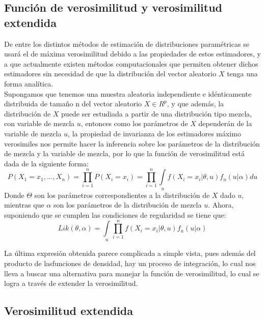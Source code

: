 \documentclass[11pt]{book}
\begin{document}
\subsection*{Función de verosimilitud y verosimilitud extendida}

 De entre los distintos métodos de estimación de distribuciones paramétricas se usará el de máxima verosimilitud debido a las propiedades de estos estimadores, y a que actualmente existen métodos computacionales que permiten obtener dichos estimadores sin necesidad de que la distribución del vector aleatorio $X$ tenga una forma analítica.\\

Supongamos que tenemos una muestra aleatoria independiente e idénticamente distribuida de tamaño n del vector aleatorio $X\in R^{p}$, y que además, la distribución de $X$ puede ser estudiada a partir de una distribución tipo mezcla, con variable de mezcla $u$, entonces como los parámetros de $X$ dependerán de la variable de mezcla $u$, la propiedad de invarianza de los estimadores máximo verosimiles nos permite hacer la inferencia sobre los parámetros de la distribución de mezcla y la variable de mezcla, por lo que la función de verosimilitud está dada de la siguiente forma:\\

\begin{equation*}
P(X_{1}=x_{1},..., X_{n})=\prod_{i=1}^{n}P(X_{i}=x_{i})=\prod_{i=1}^{n} \underset{u}{\int } f(X_{i}=x_{i}|\theta,u)f_{u}(u|\alpha)du
\end{equation*}
Donde $\Theta$ son los parámetros correspondientes a la distribución de $X$ dado $u$, mientras que $\alpha$
son los parámetros de la distribución de mezcla $u$.
Ahora, suponiendo que se cumplen las condiciones de regularidad se tiene que:
\begin{equation*}
Lik(\theta,\alpha)= \underset{u}{\int }\prod_{i=1}^{n} f(X_{i}=x_{i}|\theta,u)f_{u}(u|\alpha)
\end{equation*}


La última expresión obtenida parece complicada a simple vista, pues además del producto de lasfunciones de densidad, hay un proceso de integración, lo cual nos lleva a buscar una alternativa para manejar la función de verosimilitud, lo cual se logra a través de extender la verosimilitud.

\subsection*{Verosimilitud extendida}
\end{document}
